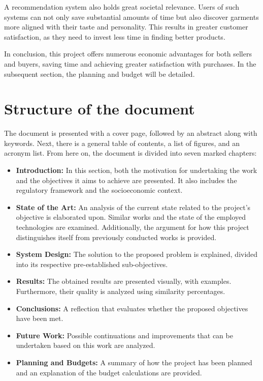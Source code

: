 \documentclass[12pt]{report} %
\begin{document}
A recommendation system also holds great societal relevance. Users of such systems can not only save substantial amounts of time but also discover garments more aligned with their taste and personality. This results in greater customer satisfaction, as they need to invest less time in finding better products.

In conclusion, this project offers numerous economic advantages for both sellers and buyers, saving time and achieving greater satisfaction with purchases. In the subsequent section, the planning and budget will be detailed.

\section*{Structure of the document}

The document is presented with a cover page, followed by an abstract along with keywords. Next, there is a general table of contents, a list of figures, and an acronym list. From here on, the document is divided into seven marked chapters:

\begin{itemize}
	\item \textbf{Introduction:} In this section, both the motivation for undertaking the work and the objectives it aims to achieve are presented. It also includes the regulatory framework and the socioeconomic context.
	\item \textbf{State of the Art:} An analysis of the current state related to the project's objective is elaborated upon. Similar works and the state of the employed technologies are examined. Additionally, the argument for how this project distinguishes itself from previously conducted works is provided.
	\item \textbf{System Design:} The solution to the proposed problem is explained, divided into its respective pre-established sub-objectives.
	\item \textbf{Results:} The obtained results are presented visually, with examples. Furthermore, their quality is analyzed using similarity percentages.
	\item \textbf{Conclusions:} A reflection that evaluates whether the proposed objectives have been met.
	\item \textbf{Future Work:} Possible continuations and improvements that can be undertaken based on this work are analyzed.
	\item \textbf{Planning and Budgets:} A summary of how the project has been planned and an explanation of the budget calculations are provided.
\end{itemize}
\end{document}
